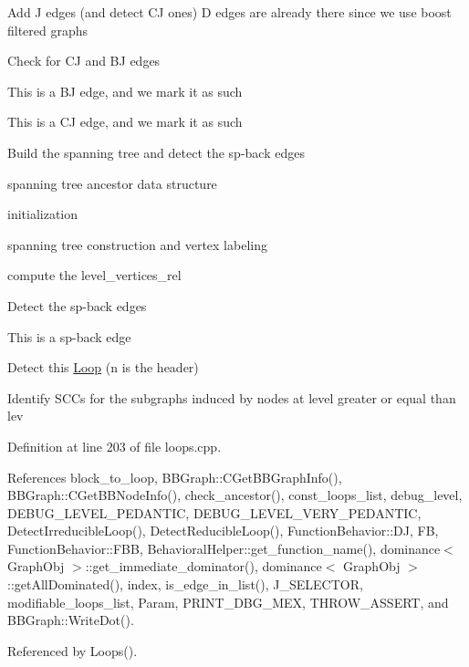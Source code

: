 Add J edges (and detect CJ ones) D edges are already there since we use boost filtered graphs

Check for CJ and BJ edges

This is a BJ edge, and we mark it as such

This is a CJ edge, and we mark it as such

Build the spanning tree and detect the sp-\/back edges

spanning tree ancestor data structure

initialization

spanning tree construction and vertex labeling

compute the level\+\_\+vertices\+\_\+rel

Detect the sp-\/back edges

This is a sp-\/back edge

Detect this \hyperlink{classLoop}{Loop} (n is the header)

Identify S\+C\+Cs for the subgraphs induced by nodes at level greater or equal than lev 

Definition at line 203 of file loops.\+cpp.



References block\+\_\+to\+\_\+loop, B\+B\+Graph\+::\+C\+Get\+B\+B\+Graph\+Info(), B\+B\+Graph\+::\+C\+Get\+B\+B\+Node\+Info(), check\+\_\+ancestor(), const\+\_\+loops\+\_\+list, debug\+\_\+level, D\+E\+B\+U\+G\+\_\+\+L\+E\+V\+E\+L\+\_\+\+P\+E\+D\+A\+N\+T\+IC, D\+E\+B\+U\+G\+\_\+\+L\+E\+V\+E\+L\+\_\+\+V\+E\+R\+Y\+\_\+\+P\+E\+D\+A\+N\+T\+IC, Detect\+Irreducible\+Loop(), Detect\+Reducible\+Loop(), Function\+Behavior\+::\+DJ, FB, Function\+Behavior\+::\+F\+BB, Behavioral\+Helper\+::get\+\_\+function\+\_\+name(), dominance$<$ Graph\+Obj $>$\+::get\+\_\+immediate\+\_\+dominator(), dominance$<$ Graph\+Obj $>$\+::get\+All\+Dominated(), index, is\+\_\+edge\+\_\+in\+\_\+list(), J\+\_\+\+S\+E\+L\+E\+C\+T\+OR, modifiable\+\_\+loops\+\_\+list, Param, P\+R\+I\+N\+T\+\_\+\+D\+B\+G\+\_\+\+M\+EX, T\+H\+R\+O\+W\+\_\+\+A\+S\+S\+E\+RT, and B\+B\+Graph\+::\+Write\+Dot().



Referenced by Loops().

